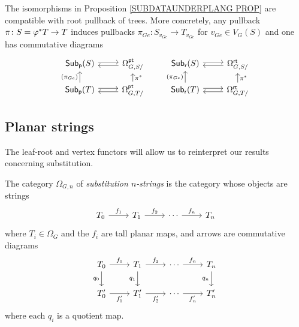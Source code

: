 \documentclass[a4paper,10pt]{article}%
\begin{document}
\begin{remark}\label{PULLCOMP REM}
	The isomorphisms in Proposition \ref{SUBDATAUNDERPLANG PROP}
	are compatible with root pullback of trees. More concretely, any pullback $\pi \colon S=\varphi^{\**} T \to T$ induces pullbacks 
	$\pi_{Ge}\colon S_{v_{Ge}} \to T_{v_{Ge}}$ for $v_{Ge} \in V_G(S)$ and one has commutative diagrams
\begin{equation}\label{SUBDATAUNDERPLANG EQ}
\begin{tikzcd}[row sep =10pt]
	\mathsf{Sub}_{\mathsf{p}}(S) \ar[r,shift left=2pt] &
	\Omega_{G,S/}^{\mathsf{pt}} \ar[l,shift left=2pt] &
	\mathsf{Sub}_{\mathsf{r}}(S) \ar[r,shift left=2pt] &
	\Omega_{G,S/}^{\mathsf{rt}} \ar[l,shift left=2pt]
\\
	\mathsf{Sub}_{\mathsf{p}}(T) \ar[r,shift left=2pt] \ar{u}{(\pi_{Ge})} &
	\Omega_{G,T/}^{\mathsf{pt}} \ar[l,shift left=2pt] \ar{u}[swap]{\pi^{\**}} &
	\mathsf{Sub}_{\mathsf{r}}(T) \ar[r,shift left=2pt] \ar{u}{(\pi_{Ge})} &
	\Omega_{G,T/}^{\mathsf{rt}} \ar[l,shift left=2pt] \ar{u}[swap]{\pi^{\**}}
\end{tikzcd}
\end{equation}
\end{remark}



\subsection{Planar strings}\label{PLANARSTRING SEC}

The leaf-root and vertex functors will allow us to reinterpret our results concerning substitution.

\begin{definition}
	The category $\Omega_{G,n}$ of 
	\textit{substitution $n$-strings} is the category whose objects are strings
	\[
	\begin{tikzcd}
	T_0 \ar{r}{f_1} & T_1 \ar{r}{f_2} & \cdots \ar{r}{f_n} & T_n
	\end{tikzcd}	
	\]
	where $T_i \in \Omega_G$ and the $f_i$ are tall planar maps, and arrows are commutative diagrams 
	\begin{equation} \label{PTNARROW EQ}
	\begin{tikzcd}
	T_0 \ar{r}{f_1} \ar{d}[swap]{q_0} & T_1 \ar{r}{f_2} \ar{d}[swap]{q_1} & \cdots \ar{r}{f_n} & T_n \ar{d}[swap]{q_n}
\\
	T'_0 \ar{r}[swap]{f'_1} & T'_1 \ar{r}[swap]{f'_2} & \cdots \ar{r}[swap]{f'_n} & T'_n
	\end{tikzcd}	
	\end{equation}
where each $q_i$ is a quotient map.
\end{definition}
\end{document}
